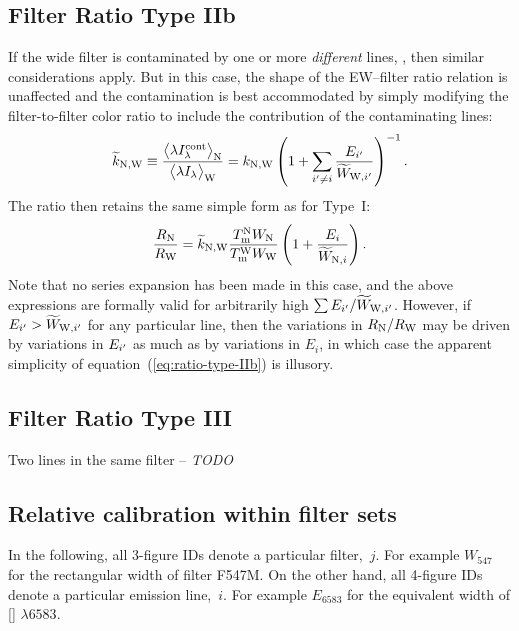 \documentclass[preprint, 12pt]{aastex}
\newcommand\nii{[\ion{N}{2}]}
\newcommand\Wav[1]{\ensuremath{\lambda #1}}
\begin{document}
\subsection{Filter Ratio Type IIb}
\label{sec:typeIIb}
If the wide filter is contaminated by one or more \emph{different} lines,
\Contam{}, then similar considerations apply.
But in this case, the shape of the
EW--filter ratio relation is unaffected and the contamination is best
accommodated by simply modifying the filter-to-filter color ratio to
include the contribution of the contaminating lines:
\begin{equation}
  \label{eq:color-correct-IIb}
  \widetilde{k}_{\mathrm{N}, \mathrm{W}} \equiv \frac{\bigl\langle \lambda I_\lambda^{\mathrm{cont}} \bigr\rangle_{\mathrm{N}}}{\bigl\langle \lambda I_\lambda \bigr\rangle_{\mathrm{W}}}
  = k_{\mathrm{N}, \mathrm{W}} 
  \left( 1 + \sum_{{i'} \ne i}\frac{E_{{i'}}}{\widetilde{W}_{\mathrm{W}, {i'}}} \right)^{-1}
  .
\end{equation}
The ratio then retains the same simple form as for Type~I: 
\begin{equation}
  \label{eq:ratio-type-IIb}
  \frac{R_{\mathrm{N}}}{R_{\mathrm{W}}} = 
  \widetilde{k}_{\mathrm{N}, \mathrm{W}} \frac{T_{\mathrm{m}}^{\mathrm{N}} W_{\mathrm{N}}}{T_{\mathrm{m}}^{\mathrm{W}} W_{\mathrm{W}}}
  \left(
    1 + \frac{E_i}{\widetilde{W}_{\mathrm{N}, i}}
  \right) .
\end{equation}
Note that no series expansion has been made in this case, and the
above expressions are formally valid for arbitrarily high \(\sum E_{{i'}}
/ \widetilde{W}_{\mathrm{W}, {i'}}\).  However, if \(E_{{i'}} >
\widetilde{W}_{\mathrm{W}, {i'}}\) for any particular line, 
then the variations in \(R_{\mathrm{N}} / R_{\mathrm{W}}\)
may be driven by variations in \(E_{{i'}}\) as much as by variations
in \(E_i\), in which case the apparent simplicity of
equation~(\ref{eq:ratio-type-IIb}) is illusory. 

\subsection{Filter Ratio Type III}
\label{sec:typeIII}

Two lines in the same filter -- \textit{TODO}

\subsection{Relative calibration within filter sets}
\label{sec:application}

In the following, all 3-figure IDs denote a particular filter,~\(j\). 
For example \(W_{547}\) for the rectangular width of filter
F547M.  
On the other hand, all 4-figure IDs denote a particular emission line,~\(i\). 
For example \(E_{6583}\) for the equivalent width of \nii{}
\Wav{6583}.
\end{document}
